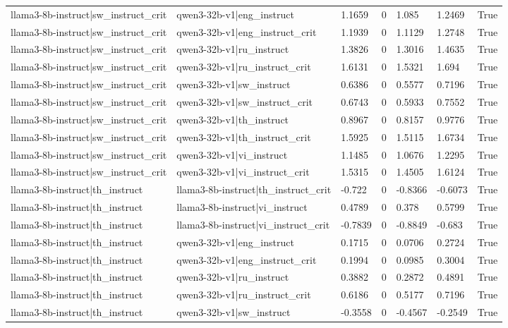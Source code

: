 \begin{table}
\begin{tabular}{llllllr}
llama3-8b-instruct|sw_instruct_crit & qwen3-32b-v1|eng_instruct & 1.1659 & 0 & 1.085 & 1.2469 & True \\
llama3-8b-instruct|sw_instruct_crit & qwen3-32b-v1|eng_instruct_crit & 1.1939 & 0 & 1.1129 & 1.2748 & True \\
llama3-8b-instruct|sw_instruct_crit & qwen3-32b-v1|ru_instruct & 1.3826 & 0 & 1.3016 & 1.4635 & True \\
llama3-8b-instruct|sw_instruct_crit & qwen3-32b-v1|ru_instruct_crit & 1.6131 & 0 & 1.5321 & 1.694 & True \\
llama3-8b-instruct|sw_instruct_crit & qwen3-32b-v1|sw_instruct & 0.6386 & 0 & 0.5577 & 0.7196 & True \\
llama3-8b-instruct|sw_instruct_crit & qwen3-32b-v1|sw_instruct_crit & 0.6743 & 0 & 0.5933 & 0.7552 & True \\
llama3-8b-instruct|sw_instruct_crit & qwen3-32b-v1|th_instruct & 0.8967 & 0 & 0.8157 & 0.9776 & True \\
llama3-8b-instruct|sw_instruct_crit & qwen3-32b-v1|th_instruct_crit & 1.5925 & 0 & 1.5115 & 1.6734 & True \\
llama3-8b-instruct|sw_instruct_crit & qwen3-32b-v1|vi_instruct & 1.1485 & 0 & 1.0676 & 1.2295 & True \\
llama3-8b-instruct|sw_instruct_crit & qwen3-32b-v1|vi_instruct_crit & 1.5315 & 0 & 1.4505 & 1.6124 & True \\
llama3-8b-instruct|th_instruct & llama3-8b-instruct|th_instruct_crit & -0.722 & 0 & -0.8366 & -0.6073 & True \\
llama3-8b-instruct|th_instruct & llama3-8b-instruct|vi_instruct & 0.4789 & 0 & 0.378 & 0.5799 & True \\
llama3-8b-instruct|th_instruct & llama3-8b-instruct|vi_instruct_crit & -0.7839 & 0 & -0.8849 & -0.683 & True \\
llama3-8b-instruct|th_instruct & qwen3-32b-v1|eng_instruct & 0.1715 & 0 & 0.0706 & 0.2724 & True \\
llama3-8b-instruct|th_instruct & qwen3-32b-v1|eng_instruct_crit & 0.1994 & 0 & 0.0985 & 0.3004 & True \\
llama3-8b-instruct|th_instruct & qwen3-32b-v1|ru_instruct & 0.3882 & 0 & 0.2872 & 0.4891 & True \\
llama3-8b-instruct|th_instruct & qwen3-32b-v1|ru_instruct_crit & 0.6186 & 0 & 0.5177 & 0.7196 & True \\
llama3-8b-instruct|th_instruct & qwen3-32b-v1|sw_instruct & -0.3558 & 0 & -0.4567 & -0.2549 & True \\

\end{tabular}
\end{table}
